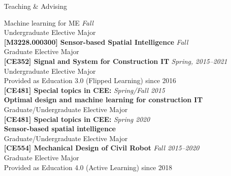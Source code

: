 \begin{rSection}{Teaching \& Advising}

{Machine learning for ME} \hfill {\em Fall} \\
Undergraduate Elective Major \\

{\bf[M3228.000300] Sensor-based Spatial Intelligence} \hfill {\em Fall} \\
Graduate Elective Major \\

{\bf[CE352] Signal and System for Construction IT} \hfill {\em Spring, 2015--2021} \\
Undergraduate Elective Major \\
Provided as Education 3.0 (Flipped Learning) since 2016\\

{\bf[CE481] Special topics in CEE:} \hfill {\em Spring/Fall 2015} \\
{\bf Optimal design and machine learning for construction IT}\\
Graduate/Undergraduate Elective Major \\

{\bf[CE481] Special topics in CEE:} \hfill {\em Spring 2020} \\
{\bf Sensor-based spatial intelligence}\\
Graduate/Undergraduate Elective Major \\

{\bf[CE554] Mechanical Design of Civil Robot } \hfill {\em Fall 2015--2020} \\
Graduate Elective Major \\
Provided as Education 4.0 (Active Learning) since 2018\\


\end{rSection}
